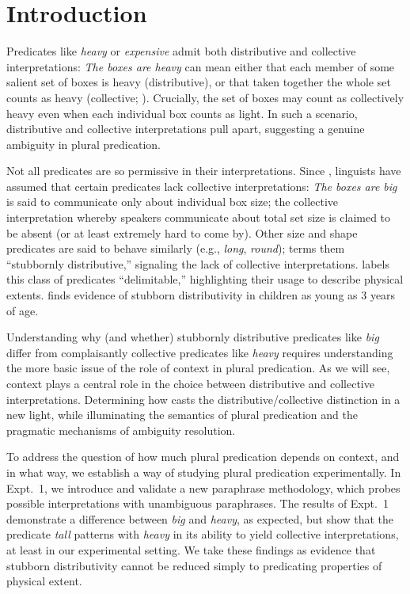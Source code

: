 \documentclass[linguex]{sp}
\begin{document}
\tableofcontents

\newpage


\section{Introduction}

Predicates like \textit{heavy} or \textit{expensive} admit both distributive and collective interpretations: \textit{The boxes are heavy} can mean either that each member of some salient set of boxes is heavy (distributive), or that taken together the whole set counts as heavy (collective; \citealp{scha1984}). Crucially, the set of boxes may count as collectively heavy even when each individual box counts as light. In such a scenario, distributive and collective interpretations pull apart, suggesting a genuine ambiguity in plural predication.

Not all predicates are so permissive in their interpretations. Since \citet[140]{quine1960}, linguists have assumed that certain predicates lack collective interpretations: \textit{The boxes are big} is said to communicate only about individual box size; the collective interpretation whereby speakers communicate about total set size is claimed to be absent (or at least extremely hard to come by). Other size and shape predicates are said to behave similarly (e.g., \emph{long}, \emph{round}); \cite{schwarzschild2011} terms them ``stubbornly distributive,'' signaling the lack of collective interpretations. \citet{zhang2013} labels this class of predicates ``delimitable,'' highlighting their usage to describe physical extents. \cite{syrett2015} finds evidence of stubborn distributivity in children as young as 3 years of age.

Understanding why (and whether) stubbornly distributive predicates like \emph{big} differ from complaisantly collective predicates like \emph{heavy} requires understanding the more basic issue of the role of context in plural predication. As we will see, context plays a central role in the choice between distributive and collective interpretations. Determining how casts the distributive/collective distinction in a new light, while illuminating the semantics of plural predication and the pragmatic mechanisms of ambiguity resolution. 

To address the question of how much plural predication depends on context, and in what way, we establish a way of studying plural predication experimentally. In Expt.~1, we introduce and validate a new paraphrase methodology, which probes possible interpretations with unambiguous paraphrases. The results of Expt.~1 demonstrate a difference between \emph{big} and \emph{heavy}, as expected, but show that the predicate \emph{tall} patterns with \emph{heavy} in its ability to yield collective interpretations, at least in our experimental setting. We take these findings as evidence that stubborn distributivity cannot be reduced simply to predicating properties of physical extent.
\end{document}
